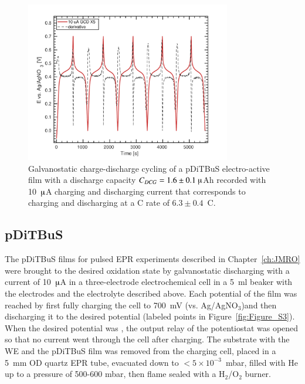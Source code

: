 \begin{figure}[h]
\center
	\includegraphics[width=0.8\textwidth]{./electrochemistry/figures/GCD_pDiTBuS.pdf}
	\caption{Galvanostatic charge-discharge cycling of a pDiTBuS electro-active film with a discharge capacity $C_{DCG}=1.6\pm0.1~\muup$Ah recorded with 10~$\muup$A charging and discharging current that corresponds to charging and discharging at a C rate of $6.3\pm0.4$~C.}
	\label{fig:GCD_DiTBuS}
\end{figure}

\par
\subsection{pDiTBuS}
The pDiTBuS films for pulsed EPR experiments described in Chapter~\ref{ch:JMRO} were brought to the desired oxidation state by galvanostatic discharging with a current of 10~$\muup$A in a three-electrode electrochemical cell in a 5~ml beaker with the electrodes and the electrolyte described above.
Each potential of the film was reached by first fully charging the cell to 700~mV (vs. Ag/AgNO$_3$)and then discharging it to the desired potential (labeled points in Figure~\ref{fig:Figure_S3}). When the desired potential was , the output relay of the potentiostat was opened so that no current went through the cell after charging. The substrate with the WE and the pDiTBuS film was removed from the charging cell, placed in a 5~mm OD quartz EPR tube, evacuated down to $<5\times10^{-3}$~mbar, filled with He up to a pressure of 500-600 mbar, then flame sealed with a H$_2$/O$_2$ burner.

